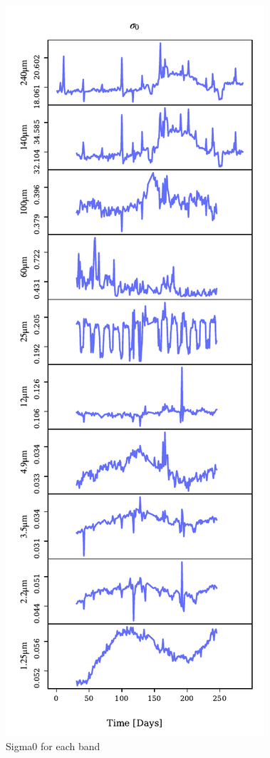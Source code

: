 \documentclass{aa}
\begin{document}
\begin{figure}
	\centering
	\includegraphics[width=\columnwidth]{figs/sigma0_bands.pdf}
	\caption{Sigma0 for each band}
	\label{fig:sigma0}
\end{figure}
\end{document}
